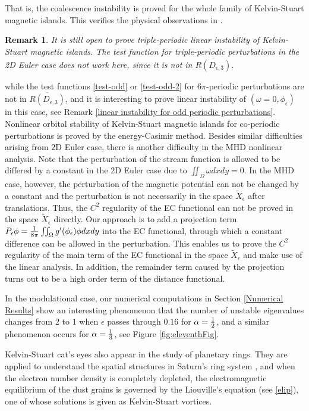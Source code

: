 \documentclass[1 [leqno, 11pt]{amsart}
\numberwithin{equation}{section}
\let\ep=\epsilon
\newtheorem{remark}[Theorem]{Remark}
\begin{document}
\begin{CJK*}{GBK}{song}
  That is, the coalescence instability is proved for the whole family of Kelvin-Stuart magnetic islands. This verifies the physical observations in \cite{Finn-Kaw1977,Pritchett-Wu1979,Bondeson1983}.
  \begin{remark}
  It is still open to prove  triple-periodic linear instability of Kelvin-Stuart magnetic islands.
  The test function for triple-periodic perturbations in the 2D Euler case does not work here, since it is not in $\overline{R(D_{\ep,3})}$.
  \end{remark}
while the test functions \eqref{test-odd} or \eqref{test-odd-2} for $6\pi$-periodic perturbations are not in $\overline{R(D_{\ep,3})}$, and it is interesting to prove linear instability of  $(\omega=0,\phi_{\ep})$ in this case,  see Remark \ref{linear instability for odd periodic perturbations}.
\fi
Nonlinear orbital stability of Kelvin-Stuart magnetic islands for co-periodic perturbations is proved by
 the energy-Casimir method.
Besides similar difficulties arising from $2$D Euler case, there is another difficulty in the MHD nonlinear analysis.
Note that the perturbation of the stream function is allowed to be differed by a constant in   the 2D Euler case due to $\iint_\Omega\omega dxdy=0$.
 In the MHD case, however, the perturbation of the magnetic potential can not be changed by a constant and the perturbation is not necessarily in the space  $\tilde X_\ep$ after translations. Thus,  the $C^2$ regularity of the EC functional can not be proved  in the space $\tilde X_\ep$ directly. Our approach is to add a projection term $P_\ep \phi={1\over8\pi}\iint_\Omega g'(\phi_\ep)\phi dxdy$   into the EC functional, through which a constant difference can be allowed in the perturbation. This enables us to  prove
 the $C^2$ regularity of the main term of  the EC functional  in the space $\tilde X_\ep$  and make use of
 the linear analysis.
 In addition, the remainder term caused by the projection turns out to be a high order term of the distance functional.

In the modulational case,
our numerical computations in Section \ref{Numerical Results} show an interesting phenomenon that  the number of unstable eigenvalues changes from $2$ to $1$ when  $\ep$
passes through $0.16$ for $\alpha={1\over2}$, and a similar phenomenon occurs for $\alpha={1\over3}$, see Figure \ref{fig:eleventhFig}.
\fi



 Kelvin-Stuart cat's eyes also  appear   in  the study of  planetary rings. They are applied to  understand the
 spatial
structures  in Saturn's ring system \cite{Shukla-Sen1996}, and   when the electron number density
is completely depleted, the electromagnetic
equilibrium of the dust grains  is governed by
the Liouville's equation (see \eqref{elip}), one of whose solutions is given as Kelvin-Stuart vortices.


\end{CJK*}
\end{document}

